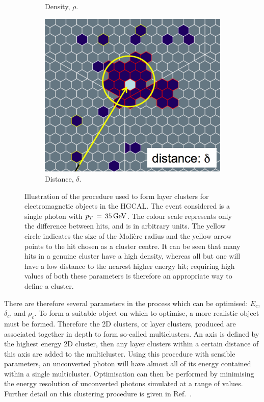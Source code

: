 \begin{figure}[h!]
\begin{subfigure}{0.292\textwidth}
    \caption{Density, $\rho$.}
  \end{subfigure}
  \begin{subfigure}{0.3\textwidth}
    \includegraphics[width=\textwidth]{Figures/HGCAL/ClusteringAlgo_Distance.png}
    \caption{Distance, $\delta$.}
  \end{subfigure}
  \caption[Illustration of the imagine algorithm used for HGCAL layer clustering.]
  {
    Illustration of the procedure used to form layer clusters for electromagnetic objects in the HGCAL.
    The event considered is a single photon with $p_T\,=\,\SI{35}{GeV}$.
    The colour scale represents only the difference between hits, and is in arbitrary units.
    The yellow circle indicates the size of the Moli\`ere radius
    and the yellow arrow points to the hit chosen as a cluster centre.
    It can be seen that many hits in a genuine cluster have a high density, 
    whereas all but one will have a low distance to the nearest higher energy hit;
    requiring high values of both these parameters is therefore an appropriate way to define a cluster.
  }
  \label{fig:hgcal_clustering}
\end{figure}

There are therefore several parameters in the process which can be optimised: $E_c$, $\delta_c$, and $\rho_c$.
To form a suitable object on which to optimise, a more realistic object must be formed.
Therefore the 2D clusters, or layer clusters, produced are associated together in depth to form so-called multiclusters. 
An axis is defined by the highest energy 2D cluster, then any layer clusters within a certain distance of this axis are added to the multicluster.
Using this procedure with sensible parameters, an unconverted photon will have almost all of its energy contained within a single multicluster.
Optimisation can then be performed by minimising the energy resolution of unconverted photons simulated at a range of \pt values.
Further detail on this clustering procedure is given in Ref.~\cite{ClusteringConf}.

